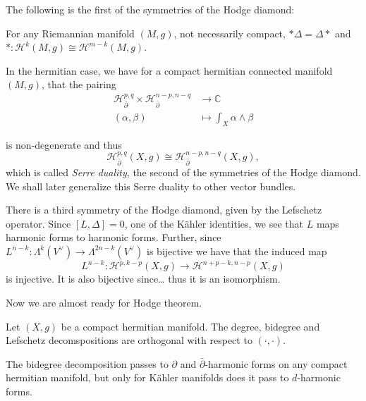 \documentclass{book}
\begin{document}
\noindent
The following is the first of the symmetries
of the Hodge diamond:

\begin{lemma}
\label{lemma-hodge-commutes-with-laplacian}
\begin{reference}
\cite[Lemma A.0.14]{huc}
\end{reference}
For any Riemannian manifold $(M,g)$,
not necessarily compact, $*\Delta=\Delta*$
and $*:\mathcal{H}^k(M,g) \cong
\mathcal{H}^{m-k}(M,g)$.
\end{lemma}

\noindent
In the hermitian case, we have for a compact
hermitian connected
manifold $(M,g)$, that the pairing
$$
\begin{aligned}
\mathcal{H}^{p,q}_{\bar\partial}
\times\mathcal{H}^{n-p,n-q}_{\bar\partial}
 &\longrightarrow \mathbb{C} \\
(\alpha,\beta) &\longmapsto
\int_X\alpha\wedge\beta
\end{aligned}
$$

\noindent
is non-degenerate and thus
$$
\mathcal{H}^{p,q}_{\bar\partial}(X,g)
\cong
\mathcal{H}^{n-p,n-q}_{\bar\partial}(X,g),
$$
which is called {\it Serre duality},
the second of the symmetries of the Hodge
diamond.
We shall later generalize this Serre duality
to other vector bundles.

There is a third symmetry of the Hodge
diamond,
given by the Lefschetz operator.
Since $[L,\Delta]=0$, one of the Kähler
identities,
we see that $L$ maps harmonic forms to
harmonic forms.
Further, since $L^{n-k}:\Lambda^k(V^\vee) \to
\Lambda^{2n-k}(V^\vee)$
is bijective we have that the induced map
$$
L^{n-k}:\mathcal{H}^{p,k-p}(X,g)
\to \mathcal{H}^{n+p-k,n-p}(X,g)
$$
is injective. It is also bijective since…
thus it is an isomorphism.

\medskip\noindent
Now we are almost ready for Hodge theorem.

\begin{proposition}
\label{proposition-decom-ortho}
\begin{reference}
\cite[Proposition 3.2.2]{huc}
\end{reference}
Let $(X,g)$ be a compact hermitian manifold.
The degree, bidegree and Lefschetz
decomspositions
are orthogonal with respect to
$(\cdot,\cdot)$.
\end{proposition}

\noindent
The bidegree decomposition passes to
$\partial$ and $\bar\partial$-harmonic forms
on any compact hermitian manifold,
but only for Kähler manifolds does it pass to
$d$-harmonic forms.
\end{document}
